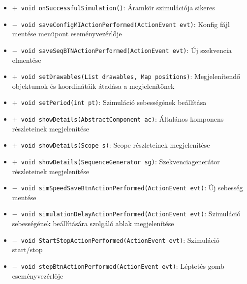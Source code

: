 \begin{itemize}
\begin{itemize}
	\item[] \texttt{$+$ void onSuccessfulSimulation()}: Áramkör szimulációja sikeres
	\item[] \texttt{$-$ void saveConfigMIActionPerformed(ActionEvent evt)}: Konfig fájl mentése menüpont eseményvezérlője
	\item[] \texttt{$-$ void saveSeqBTNActionPerformed(ActionEvent evt)}: Új szekvencia elmentése
	\item[] \texttt{$+$ void setDrawables(List drawables, Map positions)}: Megjelenítendő objektumok és koordinátáik átadása a megjelenítőnek
	\item[] \texttt{$+$ void setPeriod(int pt)}: Szimuláció sebességének beállítása
	\item[] \texttt{$+$ void showDetails(AbstractComponent ac)}: Általános komponens részleteinek megjelenítése
	\item[] \texttt{$+$ void showDetails(Scope s)}: Scope részleteinek megjelenítése
	\item[] \texttt{$+$ void showDetails(SequenceGenerator sg)}: Szekvenciagenerátor részleteinek megjelenítése
	\item[] \texttt{$-$ void simSpeedSaveBtnActionPerformed(ActionEvent evt)}: Új sebesség mentése
	\item[] \texttt{$-$ void simulationDelayActionPerformed(ActionEvent evt)}: Szimuláció sebességének beállítására szolgáló ablak megjelenítése
	\item[] \texttt{$-$ void StartStopActionPerformed(ActionEvent evt)}: Szimuláció start/stop
	\item[] \texttt{$-$ void stepBtnActionPerformed(ActionEvent evt)}: Léptetés gomb eseményvezérlője
\end{itemize}
\end{itemize}

